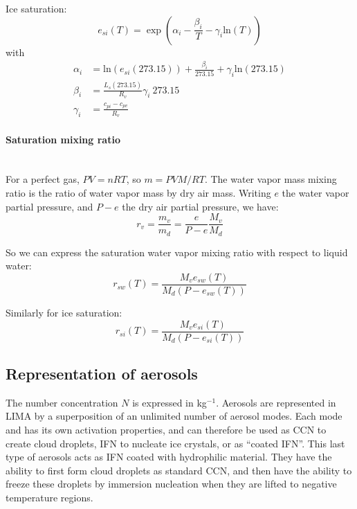 Ice saturation:
\begin{equation}
 \label{saturation-pressure-ice}
 e_{si}(T) = \exp(\alpha_i - \frac{\beta_i}{T} - \gamma_i\mathrm{ln}(T))
\end{equation}
with
\begin{align}
 \alpha_i &= \mathrm{ln}(e_{si}(273.15)) + \frac{\beta_i}{273.15} + \gamma_i\mathrm{ln}(273.15) \\
 \beta_i &= \frac{L_s(273.15)}{R_v} \gamma_i ~ 273.15 \\
 \gamma_i &= \frac{c_{pi} - c_{pv}}{R_v}
\end{align}

\paragraph{Saturation mixing ratio}
~\\
For a perfect gas, $PV=nRT$, so $m=PVM/RT$. The water vapor mass mixing ratio is the ratio of water vapor mass by dry air mass. Writing $e$ the water vapor partial pressure, and $P-e$ the dry air partial pressure, we have:
\begin{equation}
 r_v = \frac{m_v}{m_d} = \frac{e}{P-e} \frac{M_v}{M_d}
\end{equation}

So we can express the saturation water vapor mixing ratio with respect to liquid water:
\begin{equation}
 \label{saturation-mr-water}
 r_{sw}(T) = \frac{M_v e_{sw}(T)}{M_d (P - e_{sw}(T))}
\end{equation}

Similarly for ice saturation:
\begin{equation}
 \label{saturation-mr-ice}
 r_{si}(T) = \frac{M_v e_{si}(T)}{M_d (P - e_{si}(T))}
\end{equation}

\subsection{Representation of aerosols}

The number concentration $N$ is expressed in kg$^{-1}$. Aerosols are represented in LIMA by a superposition of an unlimited number of aerosol modes. Each mode and has its own activation properties, and can therefore be used as CCN to create cloud droplets, IFN to nucleate ice crystals, or as ``coated IFN''. This last type of aerosols acts as IFN coated with hydrophilic material. They have the ability to first form cloud droplets as standard CCN, and then have the ability to freeze these droplets by immersion nucleation when they are lifted to negative temperature regions.

